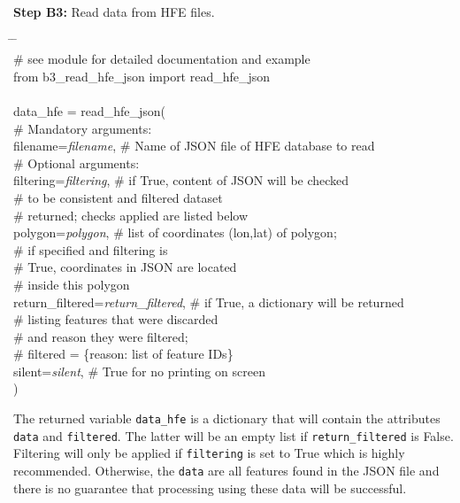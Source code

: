 \documentclass[10pt,a4paper,titlepage,parskip]{scrartcl}
\newenvironment{ttfont}{\fontfamily{\ttdefault}\selectfont}{\par}
\newcommand{\GRAU}[1]{\textcolor{ufzgray2}{#1}}
\begin{document}
\textbf{Step B3:} Read data from HFE files.
\begin{framed}
	\vspace*{-1.2cm}
	\begin{ttfont}
		\begin{tabbing}
			\hspace{1.0cm} \= \hspace{5.9cm} \= \kill \\[4pt]
			\GRAU{\# see module for detailed documentation and example}\\
			from b3\_read\_hfe\_json import read\_hfe\_json\\
			\\
			data\_hfe = read\_hfe\_json(\\
			\> \GRAU{\# Mandatory arguments:}\\
			\> filename=\textit{filename}, \> \GRAU{\# Name of JSON file of HFE database to read} \\
			\> \GRAU{\# Optional arguments:}\\
			\> filtering=\textit{filtering}, \> \GRAU{\# if True, content of JSON will be checked}\\
			\> \> \GRAU{\# to be consistent and filtered dataset }\\
			\> \> \GRAU{\# returned; checks applied are listed below}\\
			\> polygon=\textit{polygon}, \> \GRAU{\# list of coordinates (lon,lat) of polygon;}\\
			\> \> \GRAU{\# if specified and filtering is}\\
			\> \> \GRAU{\# True, coordinates in JSON are located}\\
			\> \> \GRAU{\# inside this polygon}\\
			\> return\_filtered=\textit{return\_filtered}, \> \GRAU{\# if True, a dictionary will be returned }\\
			\> \> \GRAU{\# listing features that were discarded  }\\
			\> \> \GRAU{\# and reason they were filtered; }\\
			\> \> \GRAU{\# filtered = \{reason: list of feature IDs\}}\\
			\> silent=\textit{silent}, \> \GRAU{\# True for no printing on screen}\\
			\> ) \> 
		\end{tabbing}
	\end{ttfont}
	\vspace*{-0.3cm}
\end{framed}
\vspace*{-0.3cm}
The returned variable \texttt{data\_hfe} is a dictionary that will contain the attributes \texttt{data} and \texttt{filtered}. The latter will be an empty list if \texttt{return\_filtered} is False. Filtering will only be applied if \texttt{filtering} is set to True which is highly recommended. Otherwise, the \texttt{data} are all features found in the JSON file and there is no guarantee that processing using these data will be successful. 
\end{document}
